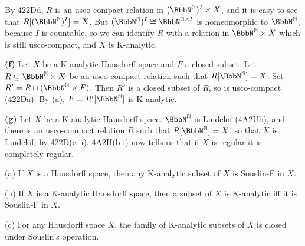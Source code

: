 {\noindent By 422Dd, $R$ is an usco-compact relation in
$(\NN)^I\times X$, and it is easy to see that $R[(\NN)^I]=X$.   But
$(\NN)^I\cong\BbbN^{\Bbb N\times I}$ is homeomorphic to $\NN$, because
$I$ is countable,
so we can identify $R$ with a relation in $\NN\times X$ which is still
usco-compact, and $X$ is K-analytic.

\medskip

{\bf (f)} Let $X$ be a K-analytic Hausdorff space and $F$ a closed
subset.   Let $R\subseteq\NN\times X$ be an usco-compact relation such
that $R[\NN]=X$.   Set $R'=R\cap(\NN\times F)$.   Then $R'$ is a closed
subset of $R$, so is
usco-compact (422Da).   By (a), $F=R'[\NN]$ is K-analytic.

\medskip

{\bf (g)} Let $X$ be a K-analytic Hausdorff space.   $\NN$ is
Lindel\"of (4A2Ub), and there is an usco-compact relation $R$ such
that $R[\NN]=X$, so that $X$ is Lindel\"of, by 422D(e-ii).   4A2H(b-i)
now tells us that if $X$ is regular it is completely regular.
}%

 (a) If $X$ is a Hausdorff space, then any
K-analytic subset of $X$ is Souslin-F in $X$.

(b) If $X$ is a K-analytic Hausdorff space, then a subset of $X$ is
K-analytic iff it is Souslin-F in $X$.

(c) For any Hausdorff space $X$, the family of K-analytic subsets of $X$
is closed under Souslin's operation.

